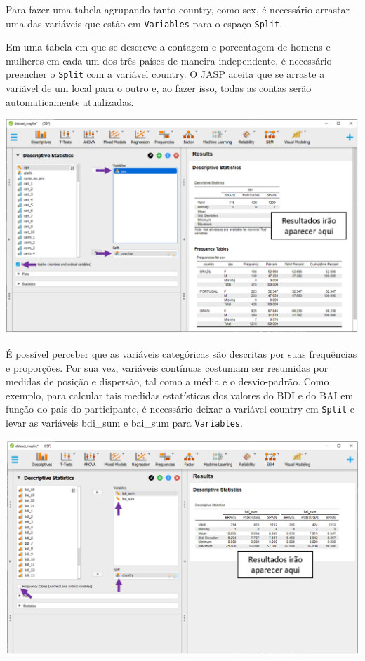 \documentclass[
]{book}
\begin{document}
Para fazer uma tabela agrupando tanto country, como sex, é necessário arrastar uma das variáveis que estão em \texttt{Variables} para o espaço \texttt{Split}.

Em uma tabela em que se descreve a contagem e porcentagem de homens e mulheres em cada um dos três países de maneira independente, é necessário preencher o \texttt{Split} com a variável country. O JASP aceita que se arraste a variável de um local para o outro e, ao fazer isso, todas as contas serão automaticamente atualizadas.

\includegraphics{./img/cap_desc_jasp_proporcao_duas_variaveis_split.png}

É possível perceber que as variáveis categóricas são descritas por suas frequências e proporções. Por sua vez, variáveis contínuas costumam ser resumidas por medidas de posição e dispersão, tal como a média e o desvio-padrão. Como exemplo, para calcular tais medidas estatísticas dos valores do BDI e do BAI em função do país do participante, é necessário deixar a variável country em \texttt{Split} e levar as variáveis bdi\_sum e bai\_sum para \texttt{Variables}.

\includegraphics{./img/cap_desc_jasp_proporcao_duas_variaveis_split2.png}
\end{document}
